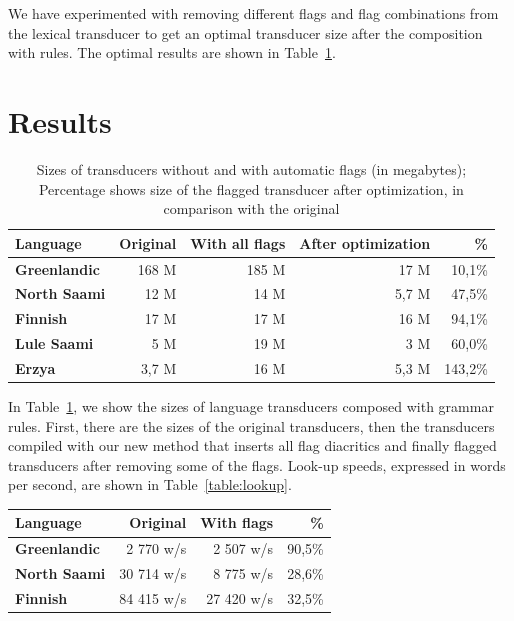 \documentclass[final]{beamer}
\begin{document}
\begin{poster}
We have experimented with removing different flags and flag combinations from the lexical transducer 
to get an optimal transducer size after the composition with rules. The optimal results are shown in Table~\ref{table:sizes}. 


\section{Results}

\begin{table}[!h]
    \centering
    \begin{tabular}{|l|r|r|r|r|}
        \hline
        \bf Language & \bf Original & \bf With all flags & \bf After optimization & \bf \% \\
        \hline\hline
        \bf Greenlandic &   168 M  & 	185	M& 17 M & 10,1\%  \\
        \bf North Saami &   12 M   &  14 M	& 5,7 M & 47,5\%  \\
        \bf Finnish &   17 M     	 &	17 M 	& 16 M & 94,1\%  \\
        \bf Lule Saami  &   5 M    & 	19 M 	& 3 M & 60,0\%  \\
        \bf Erzya       &   3,7 M  &  16 M 	& 5,3 M& 143,2\%  \\
        \hline
    \end{tabular}
    \caption{Sizes of transducers without and with automatic flags (in megabytes); Percentage shows size of the flagged transducer after optimization, in comparison with the original
    \label{table:sizes}}
\end{table}

\justifying
In Table~\ref{table:sizes}, we show the sizes of language transducers composed with grammar rules. First, there are the sizes of the original
transducers, then the transducers compiled
with our new method that inserts all flag diacritics and finally flagged transducers after removing some of the flags. Look-up speeds, expressed in words per second, are shown in Table~\ref{table:lookup}.

\begin{table}[h]
 \centering
    \begin{tabular}{|l|r|r|r|}
        \hline
        \bf Language & \bf Original & \bf With flags & \bf \% \\
        \hline\hline
        \bf Greenlandic & 2 770 w/s & 2 507 w/s & 90,5\%  \\
        \bf North Saami & 30 714 w/s & 8 775 w/s & 28,6\%  \\
        \bf Finnish  & 84 415 w/s & 27 420 w/s & 32,5\%  \\


\end{tabular}
\end{table}
\end{poster}
\end{document}
